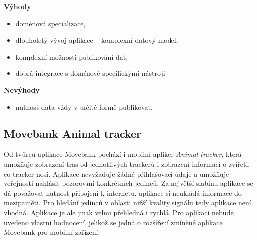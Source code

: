 \textbf{Výhody}

\begin{itemize}
	\item doménová specializace,
	\item dlouholetý vývoj aplikace -- komplexní datový model,
	\item komplexní možnosti publikování dat,
	\item dobrá integrace s doménově specifickými nástroji
\end{itemize}

\textbf{Nevýhody}

\begin{itemize}
	\item nutnost data vždy v určité formě publikovat.
\end{itemize}

\subsection{Movebank Animal tracker}

Od tvůrců aplikace Movebank pochází i mobilní aplikce \emph{Animal tracker}, která umožňuje zobrazení tras od jednotlivých trackerů i zobrazení informací o zvířeti, co tracker nosí. Aplikace nevyžaduje žádné přihlašovací údaje a umožňuje veřejnosti nahlásit pozorování konkrétních jedinců. Za největší slabinu aplikace se dá považovat nutnost připojení k internetu, aplikace si neukládá informace do mezipaměti. Pro hledání jedinců v oblasti nižší kvality signálu tedy aplikace není vhodná. Aplikace je ale jinak velmi přehledná i rychlá. Pro aplikaci nebude uvedeno vlastní hodnocení, jelikož se jedná o rozšíření zmíněné aplikace Movebank pro mobilní zařízení.

